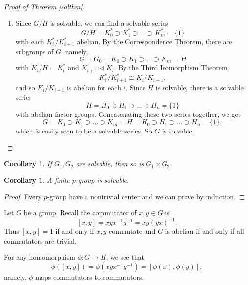\documentclass[12pt]{report}
\newtheorem{corollary}[theorem]{Corollary}
\theoremstyle{definition}
\begin{document}
\begin{proof}[Proof of Theorem \ref{solthm}]
\begin{enumerate}
\begin{align*}
			                                  & \subset  g_i(G_{i+1}N)g_i^{-1} =g_i G_{i+1}g_i^{-1}N\subset G_{i+1}N.
		      \end{align*}
		      So $G_{i+1}N$ is a subset of $G_iN$. By the Second Isomorphism Theorem, \[G_{i}N/G_{i+1}N =  G_i(G_{i+1}N)/G_{i+1}N\cong G_i/G_i\cap(G_{i+1}N).\] Note that $G_{i+1} \triangleleft G_i\cap G_{i+1}N \subset G_i$ and by the Correspondence Theorem and the Third Isomorphism Theorem, we have a surjection from $G_i/G_{i+1}$ to $G_i/G_i\cap G_{i+1}N$. This implies $G_i/G_i\cap G_{i+1}N$ is abelian and so is $G_{i}N/G_{i+1}N$. So the series above is a solvable series and $G/N$ is solvable.
		\item Since $G/H$ is solvable, we can find a solvable series
		      \[G/H=K_0^*\supset K_1^*\supset \dots\supset K_m^*=\{1\}\] with each $K_i^*/K_{i+1}^*$ abelian. By the Correspondence Theorem, there are subgroups of $G$, namely,
		      \[G=G_0=K_0\supset K_1\supset \dots\supset K_m=H\] with $K_i/H=K_i^*$ and $K_{i+1}\triangleleft K_i$. By the Third Isomorphism Theorem, $$K_i^*/K_{i+1}^* \cong K_i/K_{i+1},$$ and so $K_i/K_{i+1}$ is abelian for each $i$.
		      Since $H$ is solvable, there is a solvable series \[H=H_0\supset H_1\supset \dots\supset H_n=\{1\}\] with abelian factor groups. Concatenating these two series together, we get
		      \[G=K_0\supset K_1\supset \dots\supset K_m=H=H_0\supset H_1\supset \dots\supset H_n=\{1\},\] which is easily seen to be a solvable series. So $G$ is solvable.
	\end{enumerate}
\end{proof}

\begin{corollary}
	If $G_1, G_2$ are solvable, then so is $G_1\times G_2$.
\end{corollary}

\begin{corollary}
	A finite $p$-group is solvable.
\end{corollary}

\begin{proof}
	Every $p$-group have a nontrivial center and we can prove by induction.
\end{proof}

Let $G$ be a group. Recall the commutator of $x,y\in G$ is \[[x,y]=xyx^{-1}y^{-1}=xy(yx)^{-1}.\] Thus $[x,y]=1$ if and only if $x,y$ commutate and $G$ is abelian if and only if all commutators are trivial.

For any homomorphism $\phi: G\to H$, we see that
\[\phi([x,y])=\phi(xyx^{-1}y^{-1})=[\phi(x),\phi(y)],\] namely, $\phi$ maps commutators to commutators.
\end{document}
